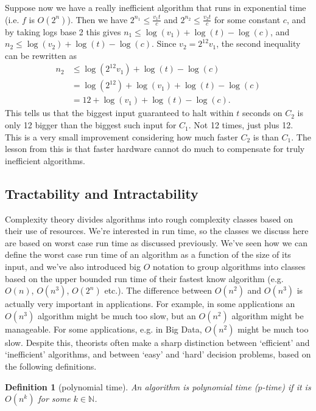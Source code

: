 \documentclass{article}
\theoremstyle{plain}
\newtheorem{definition}[theorem]{Definition}{\bfseries}{\upshape}
\theoremstyle{definition}
\begin{document}
Suppose now we have a really inefficient algorithm that runs in exponential time (i.e. $f$ is $O(2^n)$). Then we have $2^{n_1}\leq \frac{v_1t}{c}$ and $2^{n_2}\leq \frac{v_2 t}{c}$ for some constant $c$, and by taking logs base 2 this gives $n_1\leq \log(v_1) + \log(t) - \log (c)$, and $n_2\leq \log(v_2) + \log(t) - \log (c)$.
Since $v_2=2^{12}v_1$, the second inequality can be rewritten as 
\begin{align*}n_2&\leq \log(2^{12}v_1) + \log(t) - \log (c)\\
&= \log(2^{12}) +\log(v_1) + \log(t) - \log (c)\\
&= 12 + \log(v_1) + \log(t) - \log (c).\end{align*}
This tells us that the biggest input guaranteed to halt within $t$ seconds on $C_2$ is only 12 bigger than the biggest such input for $C_1$. Not 12 times, just plus 12. This is a very small improvement considering how much faster $C_2$ is than $C_1$. The lesson from this is that faster hardware cannot do much to compensate for truly inefficient algorithms.    


\subsection{Tractability and Intractability}
Complexity theory divides algorithms into rough complexity classes based on their use of resources. We're interested in run time, so the classes we discuss here are based on worst case run time as discussed previously. We've seen how we can define the worst case run time of an algorithm as a function of the size of its input, and we've also introduced big $O$ notation to group algorithms into classes based on the upper bounded run time of their fastest know algorithm (e.g. $O(n)$, $O(n^3)$, $O(2^n)$ etc.). The difference between $O(n^2)$ and $O(n^3)$ is actually very important in applications. For example, in some applications an $O(n^3)$ algorithm might be much too slow, but an $O(n^2)$ algorithm might be manageable. For some applications, e.g. in Big Data, $O(n^2)$ might be much too slow. Despite this, theorists often make a sharp distinction between  `efficient' and `inefficient' algorithms, and between `easy' and `hard' decision problems, based on the following definitions.

\begin{definition}[polynomial time]
An algorithm is polynomial time ($p$-time) if it is $O(n^k)$ for some $k\in\mathbb{N}$.
\end{definition}
\end{document}
